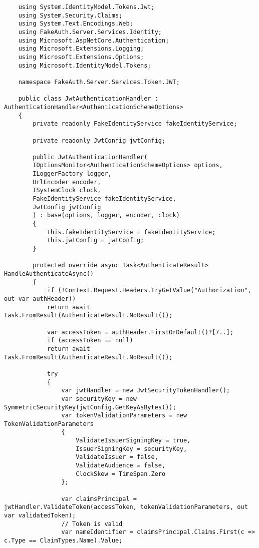 \begin{verbatim}
    using System.IdentityModel.Tokens.Jwt;
    using System.Security.Claims;
    using System.Text.Encodings.Web;
    using FakeAuth.Server.Services.Identity;
    using Microsoft.AspNetCore.Authentication;
    using Microsoft.Extensions.Logging;
    using Microsoft.Extensions.Options;
    using Microsoft.IdentityModel.Tokens;
    
    namespace FakeAuth.Server.Services.Token.JWT;
    
    public class JwtAuthenticationHandler : AuthenticationHandler<AuthenticationSchemeOptions>
    {
        private readonly FakeIdentityService fakeIdentityService;
        
        private readonly JwtConfig jwtConfig;
        
        public JwtAuthenticationHandler(
        IOptionsMonitor<AuthenticationSchemeOptions> options,
        ILoggerFactory logger,
        UrlEncoder encoder,
        ISystemClock clock,
        FakeIdentityService fakeIdentityService,
        JwtConfig jwtConfig
        ) : base(options, logger, encoder, clock)
        {
            this.fakeIdentityService = fakeIdentityService;
            this.jwtConfig = jwtConfig;
        }
        
        protected override async Task<AuthenticateResult> HandleAuthenticateAsync()
        {
            if (!Context.Request.Headers.TryGetValue("Authorization", out var authHeader))
            return await Task.FromResult(AuthenticateResult.NoResult());
            
            var accessToken = authHeader.FirstOrDefault()?[7..];
            if (accessToken == null)
            return await Task.FromResult(AuthenticateResult.NoResult());
            
            try
            {
                var jwtHandler = new JwtSecurityTokenHandler();
                var securityKey = new SymmetricSecurityKey(jwtConfig.GetKeyAsBytes());
                var tokenValidationParameters = new TokenValidationParameters
                {
                    ValidateIssuerSigningKey = true,
                    IssuerSigningKey = securityKey,
                    ValidateIssuer = false,
                    ValidateAudience = false,
                    ClockSkew = TimeSpan.Zero
                };
                
                var claimsPrincipal = jwtHandler.ValidateToken(accessToken, tokenValidationParameters, out var validatedToken);
                // Token is valid
                var nameIdentifier = claimsPrincipal.Claims.First(c => c.Type == ClaimTypes.Name).Value;
                

\end{verbatim}
